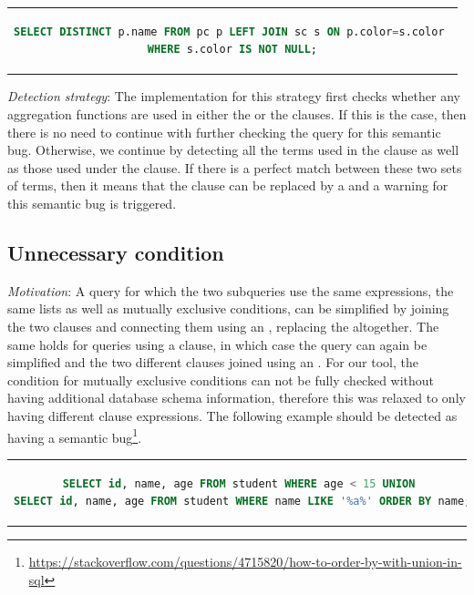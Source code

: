 \begin{center}
\begin{tabular}{c}
\begin{lstlisting}[language=SQL]
SELECT DISTINCT p.name FROM pc p LEFT JOIN sc s ON p.color=s.color 
WHERE s.color IS NOT NULL;
\end{lstlisting}
\end{tabular}
\end{center}

\noindent \emph{Detection strategy}: The implementation for this strategy first checks whether any aggregation functions are used in either the  or the  clauses. If this is the case, then there is no need to continue with further checking the query for this semantic bug. Otherwise, we continue by detecting all the terms used in the  clause as well as those used under the  clause. If there is a perfect match between these two sets of terms, then it means that the  clause can be replaced by a  and a warning for this semantic bug is triggered.

\subsection{Unnecessary  condition}
\emph{Motivation}: A query for which the two  subqueries use the same  expressions, the same  lists as well as mutually exclusive  conditions, can be simplified by joining the two  clauses and connecting them using an , replacing the  altogether. The same holds for queries using a  clause, in which case the query can again be simplified and the two different  clauses joined using an . For our tool, the condition for mutually exclusive  conditions can not be fully checked without having additional database schema information, therefore this was relaxed to only having different  clause expressions. The following example should be detected as having a semantic bug\footnote{\url{https://stackoverflow.com/questions/4715820/how-to-order-by-with-union-in-sql}}.

\begin{center}
\begin{tabular}{c}
\begin{lstlisting}[language=SQL]
SELECT id, name, age FROM student WHERE age < 15 UNION 
SELECT id, name, age FROM student WHERE name LIKE '%a%' ORDER BY name;
\end{lstlisting}
\end{tabular}
\end{center}

